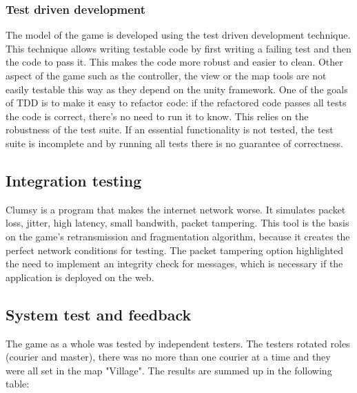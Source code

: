 \documentclass[12pt]{article}
\begin{document}
\subsubsection {Test driven development \cite{tdd}} 
The model of the game is developed using the test driven development technique. This technique allows writing testable code by first writing a failing test and then the code to pass it. This makes the code more robust and easier to clean. Other aspect of the game such as the controller, the view or the map tools are not easily testable this way as they depend on the unity framework. One of the goals of TDD is to make it easy to refactor code: if the refactored code passes all tests the code is correct, there's no need to run it to know. This relies on the robustness of the test suite. If an essential functionality is not tested, the test suite is incomplete and by running all tests there is no guarantee of correctness.
\subsection{Integration testing}
Clumsy is a program that makes the internet network worse. It simulates packet loss, jitter, high latency, small bandwith, packet tampering. This tool is the basis on the game's retransmission and fragmentation algorithm, because it creates the perfect network conditions for testing. The packet tampering option highlighted the need to implement an integrity check for messages, which is necessary if the application is deployed on the web.

\subsection{System test and feedback}
The game as a whole was tested by independent testers. The testers rotated roles (courier and master), there was no more than one courier at a time and they were all set in the map "Village". The results are summed up in the following table:
\end{document}
